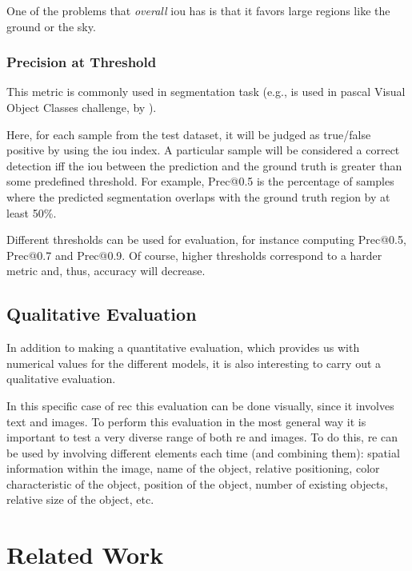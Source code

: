 One of the problems that \emph{overall} \gls{iou} has is that it favors
large regions like the ground or the sky.

\subsubsection{Precision at Threshold}

This metric is commonly used in segmentation task (e.g., is used in
\acs{pascal} Visual Object Classes challenge, by
).

Here, for each sample from the test dataset, it will be judged as true/false
positive by using the \gls{iou} index. A particular sample will be considered a
correct detection iff the \gls{iou} between the prediction and the ground truth
is greater than some predefined threshold. For example, Prec@0.5 is the
percentage of samples where the predicted segmentation overlaps with the ground
truth region by at least 50\%.

Different thresholds can be used for evaluation, for instance computing
Prec@0.5, Prec@0.7 and Prec@0.9. Of course, higher thresholds correspond to
a harder metric and, thus, accuracy will decrease.


\subsection{Qualitative Evaluation}\label{sec:qualitative-eval}

In addition to making a quantitative evaluation, which provides us with
numerical values for the different models, it is also interesting to carry out
a qualitative evaluation.

In this specific case of \gls{rec} this evaluation can be done visually, since
it involves text and images. To perform this evaluation in the most general way
it is important to test a very diverse range of both \gls{re} and images. To do
this, \gls{re} can be used by involving different elements each time (and
combining them): spatial information within the image, name of the object,
relative positioning, color characteristic of the object, position of the
object, number of existing objects, relative size of the object, etc.



\section{Related Work}\label{sec:sota}

